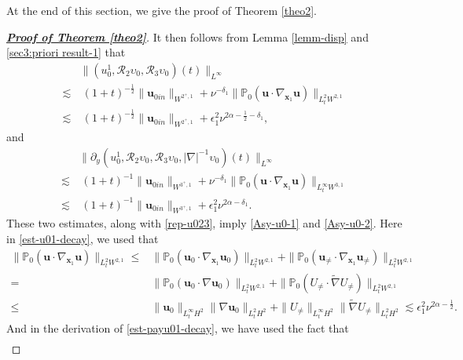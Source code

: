 \documentclass[11pt,reqno]{article}
\numberwithin{equation}{section}
\newcommand\x{\bm{x}}
\newcommand\up{\upsilon}
\newcommand\uu{\bm{u}}
\let\pa=\partial
\let\na=\nabla
\let\al=\alpha
\let\f=\frac
\let\ep=\epsilon
\def \cR {\mathcal{R}}
\begin{document}
At the end of this section, we give the proof of Theorem \ref{theo2}.
\begin{proof}[\textbf{\underline{Proof of Theorem \ref{theo2}}}]
It then follows from Lemma \ref{lemm-disp} and \eqref{sec3:priori result-1} that
\begin{align}\label{est-u01-decay}
    &\|(u_0^1,\cR_2\up_0,\cR_3\up_0)(t)\|_{L^\infty}
    \nonumber\\
    \lesssim & ~(1+t)^{-\f12} \|\uu_{0in}\|_{W^{2^+,1}}+\nu^{-\delta_1}\|\mathbb{P}_0(\uu\cdot\na_{\x_1}\uu)\|_{L^2_tW^{2,1}}
    \nonumber\\
    \lesssim & ~(1+t)^{-\f12} \|\uu_{0in}\|_{W^{2^+,1}}+\ep_1^2\nu^{2\al-\f12-\delta_1},
\end{align}
and
    \begin{align}\label{est-payu01-decay}
&\|\pa_y(u_0^1,\cR_2\up_0,\cR_3\up_0,|\nabla|^{-1}\up_0)(t)\|_{L^\infty}
\nonumber\\
   \lesssim & ~(1+t)^{-1} \|\uu_{0in}\|_{W^{3^+,1}}+\nu^{-\delta_1}\|\mathbb{P}_0(\uu\cdot\na_{\x_1}\uu)\|_{L_t^{\infty}W^{3,1}}
   \nonumber\\
    \lesssim & ~(1+t)^{-1} \|\uu_{0in}\|_{W^{3^+,1}}+\ep_1^2\nu^{2\al-\delta_1}.
\end{align}
These two estimates, along with \eqref{rep-u023}, imply
\eqref{Asy-u0-1} and \eqref{Asy-u0-2}. Here in \eqref{est-u01-decay}, we used that
\begin{align*}
    \|\mathbb{P}_0(\uu\cdot\na_{\x_1}\uu)\|_{L^2_tW^{2,1}}
    \leq &\|\mathbb{P}_0(\uu_0\cdot\na_{\x_1}\uu_0)\|_{L^2_tW^{2,1}}+\|\mathbb{P}_0(\uu_{\neq}\cdot\na_{\x_1}\uu_{\neq})\|_{L^2_tW^{2,1}}\\
    =&\|\mathbb{P}_0(\uu_0\cdot\na\uu_0)\|_{L^2_tW^{2,1}}+\|\mathbb{P}_0(U_{\neq}\cdot\widetilde{\na}U_{\neq})\|_{L^2_tW^{2,1}}\\
    \leq&\|\uu_0\|_{L_t^{\infty}H^2}\|\na\uu_0\|_{L^2_{t}H^2}+\|U_{\neq}\|_{L_t^{\infty}H^2}\|\widetilde{\na}U_{\neq}\|_{L^2_{t}H^2}
    \lesssim\ep_1^2\nu^{2\al-\f12}.
\end{align*}
And in the derivation of \eqref{est-payu01-decay}, we have used the fact that
\begin{align*}

\end{align*}
\end{proof}
\end{document}
